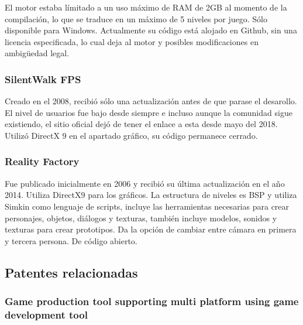 \documentclass[]{article}
\begin{document}
El motor estaba l\'imitado a un uso m\'aximo de RAM de 2GB al momento de la compilaci\'on, lo que se traduce en un m\'aximo de 5 niveles por juego.
S\'olo disponible para Windows.
Actualmente su c\'odigo est\'a alojado en Github, sin una licencia especificada, lo cual deja al motor y posibles modificaciones en ambig\"uedad legal. 


\subsubsection{SilentWalk FPS}

Creado en el 2008, recibi\'o s\'olo una actualizaci\'on antes de que parase el desarollo. El nivel de usuarios fue bajo desde siempre e incluso aunque la comunidad sigue existiendo, el sitio oficial dej\'o de tener el enlace a esta desde mayo del 2018. 
Utiliz\'o DirectX 9 en el apartado gr\'afico, su c\'odigo permanece cerrado. 

\subsubsection{Reality Factory}

Fue publicado inicialmente en 2006 y recibi\'o su \'ultima actualizaci\'on en el a\~no 2014. Utiliza DirectX9 para los gr\'aficos. La estructura de niveles es BSP y utiliza Simkin como lenguaje de scripts, incluye las herramientas necesarias para crear personajes, objetos, di\'alogos y texturas, tambi\'en incluye modelos, sonidos y texturas para crear prototipos. Da la opci\'on de cambiar entre c\'amara en primera y tercera persona. De c\'odigo abierto.


\subsection{Patentes relacionadas}

\subsubsection{Game production tool supporting multi platform using game development tool}
\end{document}
